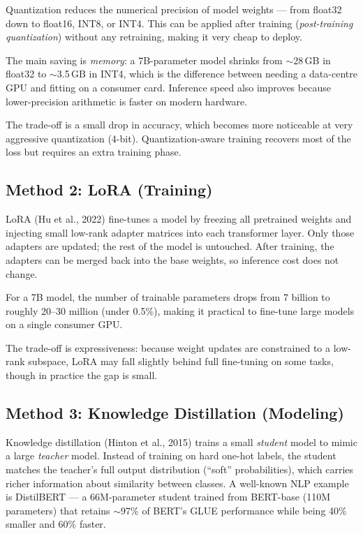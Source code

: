 \documentclass[11pt,a4paper]{article}
\begin{document}
Quantization reduces the numerical precision of model weights --- from float32
down to float16, INT8, or INT4. This can be applied after training
(\emph{post-training quantization}) without any retraining, making it very
cheap to deploy.

The main saving is \emph{memory}: a 7B-parameter model shrinks from $\sim$28\,GB
in float32 to $\sim$3.5\,GB in INT4, which is the difference between needing a
data-centre GPU and fitting on a consumer card. Inference speed also improves
because lower-precision arithmetic is faster on modern hardware.

The trade-off is a small drop in accuracy, which becomes more noticeable at
very aggressive quantization (4-bit). Quantization-aware training recovers most
of the loss but requires an extra training phase.

\subsection*{Method 2: LoRA \quad\textnormal{\small(Training)}}

LoRA (Hu et al., 2022) fine-tunes a model by freezing all pretrained weights
and injecting small low-rank adapter matrices into each transformer layer. Only
those adapters are updated; the rest of the model is untouched. After training,
the adapters can be merged back into the base weights, so inference cost does
not change.

For a 7B model, the number of trainable parameters drops from 7 billion to
roughly 20--30 million (under 0.5\%), making it practical to fine-tune large
models on a single consumer GPU.

The trade-off is expressiveness: because weight updates are constrained to a
low-rank subspace, LoRA may fall slightly behind full fine-tuning on some tasks,
though in practice the gap is small.

\subsection*{Method 3: Knowledge Distillation \quad\textnormal{\small(Modeling)}}

Knowledge distillation (Hinton et al., 2015) trains a small \emph{student} model
to mimic a large \emph{teacher} model. Instead of training on hard one-hot
labels, the student matches the teacher's full output distribution (``soft''
probabilities), which carries richer information about similarity between
classes. A well-known NLP example is DistilBERT --- a 66M-parameter student
trained from BERT-base (110M parameters) that retains $\sim$97\% of BERT's
GLUE performance while being 40\% smaller and 60\% faster.
\end{document}
